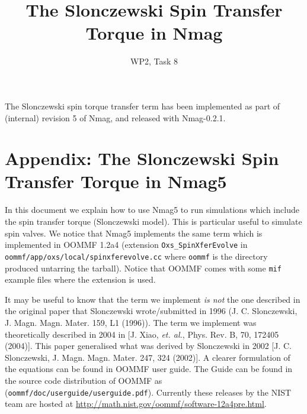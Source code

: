 \documentclass[11pt,oneside,openany]{article}
\begin{document}
\title{The Slonczewski Spin Transfer Torque in Nmag}
\date{WP2, Task 8}

\maketitle

The Slonczewski spin torque transfer term has been implemented as part of (internal) revision 5 of Nmag, and released with Nmag-0.2.1.

\section{Appendix: The Slonczewski Spin Transfer Torque in Nmag5}
In this document we explain how to use Nmag5 to run simulations which
include the spin transfer torque (Slonczewski model). This is particular
useful to simulate spin valves. We notice that Nmag5 implements the same
term which is implemented in OOMMF 1.2a4 (extension \verb|Oxs_SpinXferEvolve|
in \verb|oommf/app/oxs/local/spinxferevolve.cc| where \verb|oommf| is the
directory produced untarring the tarball). Notice that OOMMF comes with some
\verb|mif| example files where the extension is used.

It may be useful to know that the term we implement \emph{is not} the one
described in the original paper that Slonczewski wrote/submitted in 1996
(J. C. Slonczewski, J. Magn. Magn. Mater. 159, L1 (1996)).
The term we implement was theoretically described in 2004
in [J. Xiao, \emph{et. al.}, Phys. Rev. B, 70, 172405 (2004)].
This paper generalised what was derived by Slonczewski in 2002
[J. C. Slonczewski, J. Magn. Magn. Mater. 247, 324 (2002)].
A clearer formulation of the equations can be found in OOMMF user guide. The Guide can be found in the source code distribution of OOMMF as (\verb|oommf/doc/userguide/userguide.pdf|). Currently these releases by the NIST team are hosted at \href{http://math.nist.gov/oommf/software-12a4pre.html}{http://math.nist.gov/oommf/software-12a4pre.html}.
\end{document}
